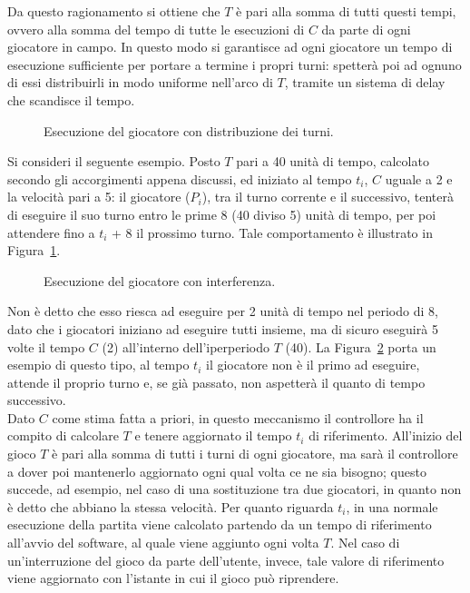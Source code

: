 Da questo ragionamento si ottiene che $T$ è pari alla somma di tutti questi tempi, ovvero alla somma del tempo di tutte le esecuzioni di $C$ da parte di ogni giocatore in campo. In questo modo si garantisce ad ogni giocatore un tempo di esecuzione sufficiente per portare a termine i propri turni: spetterà poi ad ognuno di essi distribuirli in modo uniforme nell'arco di $T$, tramite un sistema di delay che scandisce il tempo.\\

\begin{figure}[htb!]
	\centering
	\exampleOne
	\caption{Esecuzione del giocatore con distribuzione dei turni.}
	\label{fig:hyperperiod_normal}
\end{figure}

Si consideri il seguente esempio. Posto $T$ pari a 40 unità di tempo, calcolato secondo gli accorgimenti appena discussi, ed iniziato al tempo $t_i$, $C$ uguale a 2 e la velocità pari a 5: il giocatore ($P_i$), tra il turno corrente e il successivo, tenterà di eseguire il suo turno entro le prime 8 (40 diviso 5) unità di tempo, per poi attendere fino a $t_i$ + 8 il prossimo turno. Tale comportamento è illustrato in Figura~\ref{fig:hyperperiod_normal}.\\

\begin{figure}[htb!]
	\centering
	\exampleTwo
	\caption{Esecuzione del giocatore con interferenza.}
	\label{fig:hyperperiod_interference}
\end{figure}

Non è detto che esso riesca ad eseguire per 2 unità di tempo nel periodo di 8, dato che i giocatori iniziano ad eseguire tutti insieme, ma di sicuro eseguirà 5 volte il tempo $C$ (2) all'interno dell'iperperiodo $T$ (40). La Figura~\ref{fig:hyperperiod_interference} porta un esempio di questo tipo, al tempo $t_i$ il giocatore non è il primo ad eseguire, attende il proprio turno e, se già passato, non aspetterà il quanto di tempo successivo.\\

Dato $C$ come stima fatta a priori, in questo meccanismo il controllore ha il compito di calcolare $T$ e tenere aggiornato il tempo $t_i$ di riferimento. All'inizio del gioco $T$ è pari alla somma di tutti i turni di ogni giocatore, ma sarà il controllore a dover poi mantenerlo aggiornato ogni qual volta ce ne sia bisogno; questo succede, ad esempio, nel caso di una sostituzione tra due giocatori, in quanto non è detto che abbiano la stessa velocità. Per quanto riguarda $t_i$, in una normale esecuzione della partita viene calcolato partendo da un tempo di riferimento all'avvio del software, al quale viene aggiunto ogni volta $T$. Nel caso di un'interruzione del gioco da parte dell'utente, invece, tale valore di riferimento viene aggiornato con l'istante in cui il gioco può riprendere.\\

